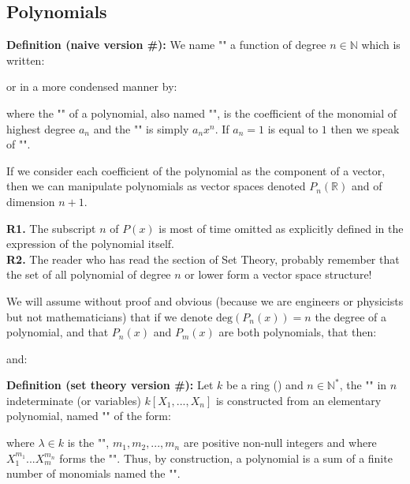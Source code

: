 	\subsection{Polynomials}\label{polynomial}
	\textbf{Definition (naive version \#\mydef):} We name "" a function of degree $n\in \mathbb{N}$ which is written:
	
	or in a more condensed manner by:
	
	 where the "" of a polynomial, also named "", is the coefficient of the monomial of highest degree $a_n$ and the "" is simply $a_nx^n$. If $a_n=1$ is equal to $1$ then we speak of "".
	 
	If we consider each coefficient of the polynomial as the component of a vector\label{polynomial vector}, then we can manipulate polynomials as vector spaces denoted $P_n(\mathbb{R})$ and of dimension $n+1$.
	\begin{tcolorbox}[title=Remarks,colframe=black,arc=10pt]
	\textbf{R1.} The subscript $n$ of $P (x)$ is most of time omitted as explicitly defined in the expression of the polynomial itself.\\
	
	\textbf{R2.} The reader who has read the section of Set Theory, probably remember that the set of all polynomial of degree $n$ or lower form a vector space structure!
	\end{tcolorbox}
	We will assume without proof and obvious (because we are engineers or physicists but not mathematicians) that if we denote $\text{deg}(P_n(x))=n$ the degree of a polynomial, and that $P_n(x)$ and $P_m(x)$ are both polynomials, that then:
	
	and:
	
	
	\textbf{Definition (set theory version \#\mydef):} Let $k$ be a ring () and $n\in \mathbb{N}^{*}$, the "\label{polynomial ring}" in $n$ indeterminate (or variables) $k[X_1,...,X_n]$ is constructed from an elementary polynomial, named "" of the form:
	
	where $\lambda \in k$ is the "", $m_1,m_2,...,m_n$ are positive non-null integers and where $X_1^{m_1}...X_m^{m_n}$ forms the "". Thus, by construction, a polynomial is a sum of a finite number of monomials named the "".
	
